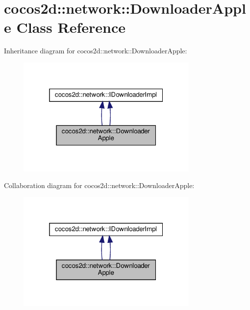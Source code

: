 \hypertarget{classcocos2d_1_1network_1_1DownloaderApple}{}\section{cocos2d\+:\+:network\+:\+:Downloader\+Apple Class Reference}
\label{classcocos2d_1_1network_1_1DownloaderApple}


Inheritance diagram for cocos2d\+:\+:network\+:\+:Downloader\+Apple\+:
\nopagebreak
\begin{figure}[H]
\begin{center}
\leavevmode
\includegraphics[width=253pt]{classcocos2d_1_1network_1_1DownloaderApple__inherit__graph}
\end{center}
\end{figure}


Collaboration diagram for cocos2d\+:\+:network\+:\+:Downloader\+Apple\+:
\nopagebreak
\begin{figure}[H]
\begin{center}
\leavevmode
\includegraphics[width=253pt]{classcocos2d_1_1network_1_1DownloaderApple__coll__graph}
\end{center}
\end{figure}
